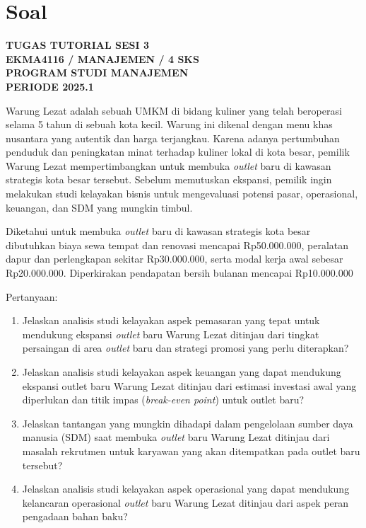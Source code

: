 \chapter{Soal}


\begin{center}
    \bfseries
    TUGAS TUTORIAL SESI 3 \\
    EKMA4116 / MANAJEMEN / 4 SKS \\
    PROGRAM STUDI MANAJEMEN \\
    PERIODE 2025.1
\end{center}


Warung Lezat adalah sebuah UMKM di bidang kuliner yang telah beroperasi selama 5 tahun di sebuah kota kecil. Warung ini dikenal dengan menu khas nusantara yang autentik dan harga terjangkau. Karena adanya pertumbuhan penduduk dan peningkatan minat terhadap kuliner lokal di kota besar, pemilik Warung Lezat mempertimbangkan untuk membuka \textit{outlet} baru di kawasan strategis kota besar tersebut. Sebelum memutuskan ekspansi, pemilik ingin melakukan studi kelayakan bisnis untuk mengevaluasi potensi pasar, operasional, keuangan, dan SDM yang mungkin timbul.

Diketahui untuk membuka \textit{outlet} baru di kawasan strategis kota besar dibutuhkan biaya sewa tempat dan renovasi mencapai Rp50.000.000, peralatan dapur dan perlengkapan sekitar Rp30.000.000, serta modal kerja awal sebesar Rp20.000.000. Diperkirakan pendapatan bersih bulanan mencapai Rp10.000.000


\noindent Pertanyaan:

\begin{enumerate}
    \item Jelaskan analisis studi kelayakan aspek pemasaran yang tepat untuk mendukung ekspansi \textit{outlet} baru Warung Lezat ditinjau dari tingkat persaingan di area \textit{outlet} baru dan strategi promosi yang perlu diterapkan?
    
    \item Jelaskan analisis studi kelayakan aspek keuangan yang dapat mendukung ekspansi outlet baru Warung Lezat ditinjau dari estimasi investasi awal yang diperlukan dan titik impas (\textit{break-even point}) untuk outlet baru?
    
    \item Jelaskan tantangan yang mungkin dihadapi dalam pengelolaan sumber daya manusia (SDM) saat membuka \textit{outlet} baru Warung Lezat ditinjau dari masalah rekrutmen untuk karyawan yang akan ditempatkan pada outlet baru tersebut?
    
    \item Jelaskan analisis studi kelayakan aspek operasional yang dapat mendukung kelancaran operasional \textit{outlet} baru Warung Lezat ditinjau dari aspek peran pengadaan bahan baku?
\end{enumerate}